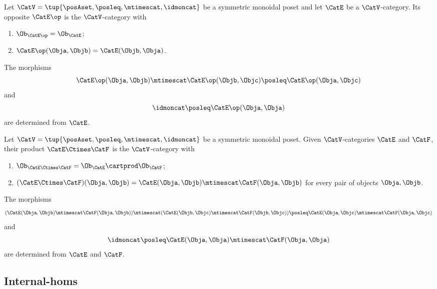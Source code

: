 \begin{ctdefinition}
    \label{def:monoidal-poset-cat-op}
    Let $\CatV = \tup{\posAset, \posleq, \mtimescat, \idmoncat}$ be a symmetric monoidal poset and let $\CatE$ be a $\CatV$-category.
    Its opposite $\CatE\op$ is the $\CatV$-category with
    \begin{enumerate}
        \item $\Ob_{\CatE\op} = \Ob_\CatE$;
        \item $\CatE\op(\Obja, \Objb) = \CatE(\Objb, \Obja)$.
    \end{enumerate}

    The morphisms
    \begin{equation}
        \CatE\op(\Obja, \Objb) \mtimescat \CatE\op(\Objb, \Objc) \posleq \CatE\op(\Obja, \Objc)
    \end{equation}
    and
    \begin{equation}
        \idmoncat \posleq \CatE\op(\Obja, \Obja)
    \end{equation}
    are determined from $\CatE$.
\end{ctdefinition}

\begin{ctdefinition}
    \label{def:monoidal-poset-cat-product}
    Let $\CatV = \tup{\posAset, \posleq, \mtimescat, \idmoncat}$ be a symmetric monoidal poset.
    Given $\CatV$-categories $\CatE$ and $\CatF$, their product $\CatE \Ctimes \CatF$ is the $\CatV$-category with
    \begin{enumerate}
        \item $\Ob_{\CatE \Ctimes \CatF} = \Ob_\CatE \cartprod \Ob_\CatF$;
        \item $(\CatE \Ctimes \CatF)(\Obja, \Objb) = \CatE (\Obja, \Objb) \mtimescat \CatF (\Obja, \Objb)$ for every pair of objects $\Obja, \Objb$.
    \end{enumerate}
    The morphisms
    \begin{equation}
        (\CatE(\Obja, \Objb) \mtimescat \CatF(\Obja, \Objb)) \mtimescat (\CatE(\Objb, \Objc) \mtimescat \CatF(\Objb, \Objc)) \posleq \CatE(\Obja, \Objc) \mtimescat \CatF(\Obja, \Objc)
    \end{equation}
    and
    \begin{equation}
        \idmoncat \posleq \CatE(\Obja, \Obja) \mtimescat \CatF(\Obja, \Obja)
    \end{equation}
    are determined from $\CatE$ and $\CatF$.
\end{ctdefinition}

\subsection{Internal-homs}

